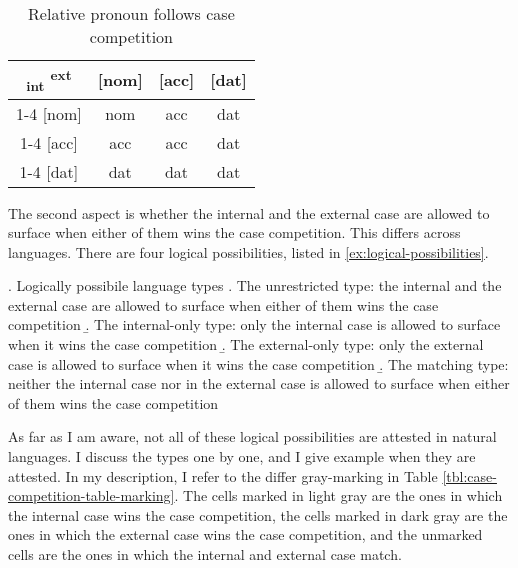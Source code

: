 \begin{table}[ht]
  \center
  \caption{Relative pronoun follows case competition}
  \begin{tabular}{c|c|c|c}
    \toprule
    \textsubscript{\ac{int}} \textsuperscript{\ac{ext}}
           & [\ac{nom}]
           & [\ac{acc}]
           & [\ac{dat}]
           \\ \cmidrule{1-4}
       [\ac{nom}]
           & \ac{nom}
           & \ac{acc}
           & \ac{dat}
           \\ \cmidrule{1-4}
       [\ac{acc}]
           & \ac{acc}
           & \ac{acc}
           & \ac{dat}
           \\ \cmidrule{1-4}
       [\ac{dat}]
           & \ac{dat}
           & \ac{dat}
           & \ac{dat}
           \\
     \bottomrule
  \end{tabular}
    \label{tbl:case-competition-table}
\end{table}

The second aspect is whether the internal and the external case are allowed to surface when either of them wins the case competition. This differs across languages. There are four logical possibilities, listed in \ref{ex:logical-possibilities}.

\ex. Logically possibile language types\label{ex:logical-possibilities}
\let\oldalph=\alph\let\alph=\roman
\a. The unrestricted type: the internal and the external case are allowed to surface when either of them wins the case competition\label{ex:int-ext}
\b. The internal-only type: only the internal case is allowed to surface when it wins the case competition\label{ex:int-only}
\b. The external-only type: only the external case is allowed to surface when it wins the case competition\label{ex:ext-only}
\b. The matching type: neither the internal case nor in the external case is allowed to surface when either of them wins the case competition\label{ex:matching}
\global\let\alph=\oldalph

As far as I am aware, not all of these logical possibilities are attested in natural languages. I discuss the types one by one, and I give example when they are attested. In my description, I refer to the differ gray-marking in Table \ref{tbl:case-competition-table-marking}. The cells marked in light gray are the ones in which the internal case wins the case competition, the cells marked in dark gray are the ones in which the external case wins the case competition, and the unmarked cells are the ones in which the internal and external case match.


